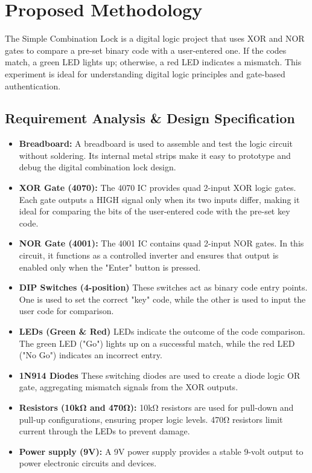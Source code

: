 \chapter{Proposed Methodology}
The Simple Combination Lock is a digital logic project that uses XOR and NOR gates to compare a pre-set binary code with a user-entered one. If the codes match, a green LED lights up; otherwise, a red LED indicates a mismatch. This experiment is ideal for understanding digital logic principles and gate-based authentication.



\section{Requirement Analysis \& Design Specification}
\begin{itemize}
\item \textbf{Breadboard:}  A breadboard is used to assemble and test the logic circuit without soldering. Its internal metal strips make it easy to prototype and debug the digital combination lock design.
\item\textbf{XOR Gate (4070):} The 4070 IC provides quad 2-input XOR logic gates. Each gate outputs a HIGH signal only when its two inputs differ, making it ideal for comparing the bits of the user-entered code with the pre-set key code.
\item\textbf{NOR Gate (4001):} The 4001 IC contains quad 2-input NOR gates. In this circuit, it functions as a controlled inverter and ensures that output is enabled only when the "Enter" button is pressed.
\item \textbf{DIP Switches (4-position)} These switches act as binary code entry points. One is used to set the correct "key" code, while the other is used to input the user code for comparison.
\item\textbf{LEDs (Green & Red)} LEDs indicate the outcome of the code comparison. The green LED ("Go") lights up on a successful match, while the red LED ("No Go") indicates an incorrect entry.
\item \textbf{1N914 Diodes} These switching diodes are used to create a diode logic OR gate, aggregating mismatch signals from the XOR outputs.
\item\textbf{Resistors (10kΩ and 470Ω):} 10kΩ resistors are used for pull-down and pull-up configurations, ensuring proper logic levels. 470Ω resistors limit current through the LEDs to prevent damage.
\item \textbf{Power supply (9V):} A 9V power supply provides a stable 9-volt output to power electronic circuits and devices.\cite{2.1.1}
\end{itemize}

